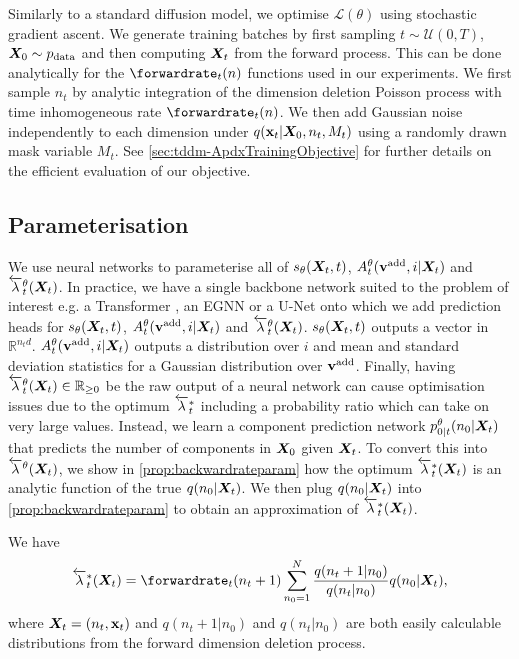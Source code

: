 Similarly to a standard diffusion model, we optimise $\mathcal{L}(\theta)$ using stochastic gradient ascent. We generate training batches by first sampling $t \sim \mathcal{U}(0, T)$, ${\bm{X}}_0 \sim p_{\rm{data}}$ and then computing ${\bm{X}}_t$ from  the forward process. This can be done analytically for the $\forwardrate_t(n)$ functions used in our experiments. We first sample $n_t$ by analytic integration of the dimension deletion Poisson process with time inhomogeneous rate $\forwardrate_t(n)$. We then add Gaussian noise independently to each dimension under $q({\mathbf{x}}_t | {\bm{X}}_0, n_t, M_t)$ using a randomly drawn mask variable $M_t$. See \cref{sec:tddm-ApdxTrainingObjective} for further details on the efficient evaluation of our objective.

\subsection{Parameterisation}

We use neural networks to parameterise all of $s_\theta({\bm{X}}_t, t)$, $A_t^\theta({\mathbf{v}}^{\textup{add}}, i | {\bm{X}}_t)$ and $\overleftarrow{\lambda}_t^\theta({\bm{X}}_t)$. In practice, we have a single backbone network suited to the problem of interest e.g. a Transformer \cite{vaswani2017attention}, an EGNN \cite{satorras2021n} or a U-Net \cite{ronneberger2015u} onto which we add prediction heads for $s_\theta({\bm{X}}_t, t)$, $A_t^\theta({\mathbf{v}}^{\textup{add}}, i | {\bm{X}}_t)$ and $\overleftarrow{\lambda}_t^\theta({\bm{X}}_t)$. $s_\theta({\bm{X}}_t, t)$ outputs a vector in $\mathbb{R}^{n_t d}$. $A_t^\theta({\mathbf{v}}^{\textup{add}}, i | {\bm{X}}_t)$ outputs a distribution over $i$ and mean and standard deviation statistics for a Gaussian distribution over ${\mathbf{v}}^{\textup{add}}$. Finally, having $\overleftarrow{\lambda}_t^\theta({\bm{X}}_t) \in \mathbb{R}_{\geq 0}$ be the raw output of a neural network can cause optimisation issues due to the optimum $\overleftarrow{\lambda}^*_t$ including a probability ratio which can take on very large values. Instead, we learn a component prediction network $p^\theta_{0|t}(n_0 | {\bm{X}}_t)$ that predicts the number of components in ${\bm{X}}_0$ given ${\bm{X}}_t$. To convert this into $\overleftarrow{\lambda}^\theta({\bm{X}}_t)$, we show in \cref{prop:backwardrateparam} how the optimum $\overleftarrow{\lambda}_t^*({\bm{X}}_t)$ is an analytic function of the true $q(n_0 | {\bm{X}}_t)$. We then plug $q(n_0 | {\bm{X}}_t)$ into \cref{prop:backwardrateparam} to obtain an approximation of $\overleftarrow{\lambda}_t^*({\bm{X}}_t)$.
\begin{proposition} We have
    \label{prop:backwardrateparam}
    \begin{equation}\label{eq:backwardrateparam}
        \backwardrate_{t}^*(\mX_t) = \forwardrate_{t}(n_t+1) \sum_{n_0=1}^N \frac{q(n_t + 1 | n_0)}{q(n_t | n_0)} q(n_0 | \mX_t),
    \end{equation}
    where ${\bm{X}}_t = (n_t, {\mathbf{x}}_t)$ and $q(n_t + 1 | n_0)$ and $q(n_t | n_0)$ are both easily calculable distributions from the forward dimension deletion process.
\end{proposition}



